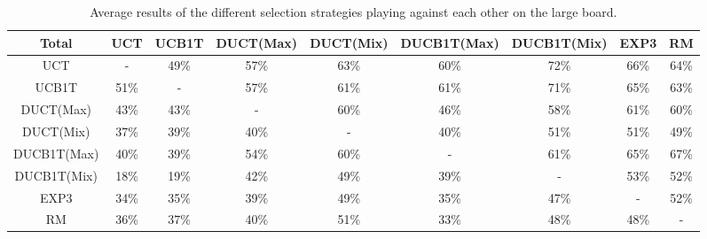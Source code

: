 \documentclass{article}
\begin{document}
\begin{table}[h!]\scriptsize
\centering
\begin{tabular}{|c||c|c|c|c|c|c|c|c|}
									\hline
  Total 		& UCT 	& UCB1T		& DUCT(Max)	& DUCT(Mix)	& DUCB1T(Max)	& DUCB1T(Mix)	& EXP3	& RM				\\ 	\hline\hline
  UCT 			&  -	& 49\%		& 57\%		& 63\%		& 60\%		& 72\%		& 66\%	& 64\%				\\ 	\hline
  UCB1T 		& 51\% 	& - 		& 57\%		& 61\%		& 61\%		& 71\%		& 65\%	& 63\%				\\ 	\hline
  DUCT(Max) 		& 43\% 	& 43\% 		& -		& 60\%		& 46\%		& 58\%		& 61\%	& 60\%				\\ 	\hline
  DUCT(Mix) 		& 37\% 	& 39\% 		& 40\%		& -		& 40\%		& 51\%		& 51\%	& 49\%				\\ 	\hline
  DUCB1T(Max)	 	& 40\% 	& 39\% 		& 54\%		& 60\%		& -		& 61\%		& 65\%	& 67\%				\\ 	\hline
  DUCB1T(Mix)	 	& 18\% 	& 19\% 		& 42\%		& 49\%		& 39\%		& -		& 53\%	& 52\%				\\ 	\hline
  EXP3 			& 34\%	& 35\% 		& 39\%		& 49\%		& 35\%		& 47\%		& -	& 52\%				\\ 	\hline
  RM		 	& 36\% 	& 37\%		& 40\%		& 51\%		& 33\%		& 48\%		& 48\%	& -				\\ 	\hline
\end{tabular}
\caption{Average results of the different selection strategies playing against each other on the large board.}
\label{table:round_robin_total}
\end{table}
\end{document}
